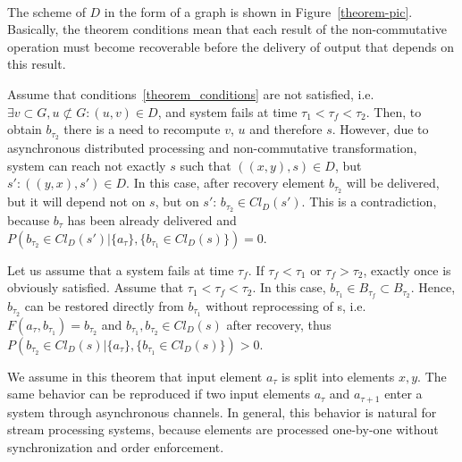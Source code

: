 \begin{sketch}
$ $\newline

The scheme of $D$ in the form of a graph is shown in Figure~\ref{theorem-pic}. Basically, the theorem conditions mean that each result of the non-commutative operation must become recoverable before the delivery of output that depends on this result. 
$ $\newline

\newline

  Assume that conditions~\ref{theorem_conditions} are not satisfied, i.e. $\exists v \subset G, u \not\subset G: (u, v) \in D$, and system fails at time $\tau_1<\tau_f<\tau_2$. Then, to obtain $b_{\tau_2}$ there is a need to recompute $v$, $u$ and therefore $s$. However, due to asynchronous distributed processing and non-commutative transformation, system can reach not exactly $s$ such that $((x,y), s) \in D$, but $s':((y,x),s')\in D$. In this case, after recovery element $b_{\tau_2}$ will be delivered, but it will depend not on $s$, but on $s'$: $b_{\tau_2}\in Cl_D(s')$. This is a contradiction, because $b_\tau$ has been already delivered and $P(b_{\tau_2}\in Cl_D(s')|\{a_\tau\},\{b_{\tau_1} \in Cl_D(s) \})=0$.
$ $\newline

\newline

Let us assume that a  system fails at time $\tau_f$. If $\tau_f < \tau_1$ or $\tau_f > \tau_2$, exactly once is obviously satisfied. Assume that $\tau_1<\tau_f<\tau_2$. In this case, $b_{\tau_1}\in B_{\tau_f}\subset B_{\tau_2}$. Hence, $b_{\tau_2}$ can be restored directly from $b_{\tau_1}$ without reprocessing of s, i.e. $F(a_\tau,b_{\tau_1})=b_{\tau_2}$ and $b_{\tau_1}, b_{\tau_2} \in Cl_D(s)$ after recovery, thus $P(b_{\tau_2}\in Cl_D(s)|\{a_\tau\},\{b_{\tau_1} \in Cl_D(s) \})>0$.
\end{sketch}


We assume   in this  theorem    that input element $a_\tau$ is split into elements $x,y$. The same behavior can be reproduced if two input elements $a_\tau$ and $a_{\tau+1}$ enter a system through asynchronous channels. In general, this behavior is natural for stream processing systems, because elements are processed one-by-one without synchronization and order enforcement. 

